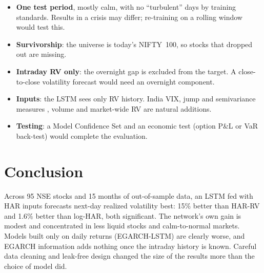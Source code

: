 \begin{itemize}
\item \textbf{One test period}, mostly calm, with no ``turbulent'' days by training standards. Results in a
crisis may differ; re-training on a rolling window would test this.
\item \textbf{Survivorship}: the universe is today's NIFTY~100, so stocks that dropped out are missing.
\item \textbf{Intraday RV only}: the overnight gap is excluded from the target. A close-to-close
volatility forecast would need an overnight component.
\item \textbf{Inputs}: the LSTM sees only RV history. India VIX, jump and semivariance measures
\citep{bollerslev2016}, volume and market-wide RV are natural additions.
\item \textbf{Testing}: a Model Confidence Set \citep{hansen2011} and an economic test (option P\&L or VaR
back-test) would complete the evaluation.
\end{itemize}

\section{Conclusion}

Across 95 NSE stocks and 15 months of out-of-sample data, an LSTM fed with HAR inputs forecasts next-day
realized volatility best: 15\% better than HAR-RV and 1.6\% better than log-HAR, both significant. The
network's own gain is modest and concentrated in less liquid stocks and calm-to-normal markets. Models
built only on daily returns (EGARCH-LSTM) are clearly worse, and EGARCH information adds nothing once the
intraday history is known. Careful data cleaning and leak-free design changed the size of the results
more than the choice of model did.
